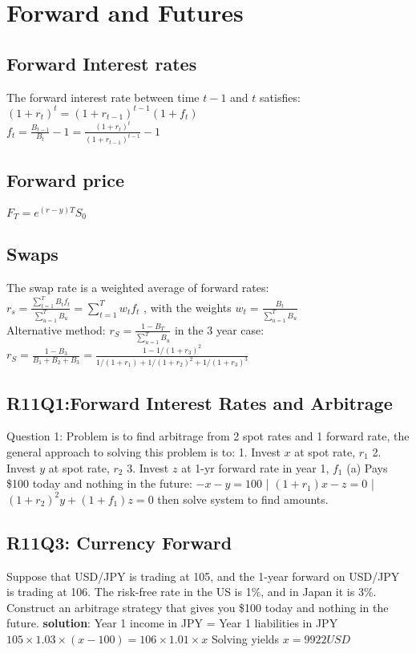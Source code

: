 \section{Forward and Futures}


\subsection*{Forward Interest rates}
The forward interest rate between time $t-1$ and $t$ satisfies:\\
$ (1+r_t)^t = (1+r_{t-1})^{t-1}(1+f_t) $ \\
$ f_t = \frac{B_{t-1}}{B_t} -1 =\frac{(1+r_t)^t}{(1+r_{t-1})^{t-1}} -1 $


\subsection*{Forward price}
$F_T=e^{(r-y)T} S_0$


\subsection*{Swaps}
The swap rate is a weighted average of forward rates: \\
$r_s = \frac{\sum_{t=1}^{T}B_t f_t}{\sum_{u=1}^{T}B_u} = \sum_{t=1}^{T} w_t  f_t$ , 
with the weights $w_t = \frac{B_t}{\sum_{u=1}^{T} B_u}$ \\

Alternative method: $r_S=\frac{1-B_T}{\sum_{u=1}^{T}B_u}$ in the 3 year case: $r_S=\frac{1-B_3}{B_1+B_2+B_3}=\frac{1-1/(1+r_3)^2}{1/(1+r_1)+1/(1+r_2)^2+1/(1+r_3)^3}$ 


\subsection*{R11Q1:Forward Interest Rates and Arbitrage }Question 1: 
Problem is to find arbitrage from 2 spot rates and 1 forward rate, the general approach to solving this problem is to:
1. Invest $x$ at spot rate, $r_1$
2. Invest $y$ at spot rate, $r_2$
3. Invest $z$ at 1-yr forward rate in year 1, $f_1$
(a) Pays \$100 today and nothing in the future:
$-x-y = 100$ |
$(1 + r_1)x -z = 0$ |
$(1 + r_2)^2y + (1 + f_1)z = 0$ then solve system to find amounts.

\subsection*{R11Q3: Currency Forward}
Suppose that USD/JPY is trading at 105, and the 1-year forward on USD/JPY
is trading at 106. The risk-free rate in the US is 1\%, and in Japan it is 3\%.
Construct an arbitrage strategy that gives you \$100 today and nothing in the
future. {\bf solution}: Year 1 income in JPY = Year 1 liabilities in JPY
$105\times 1.03 \times (x - 100) = 106 \times 1.01 \times x$
Solving yields $x= 9922 USD$